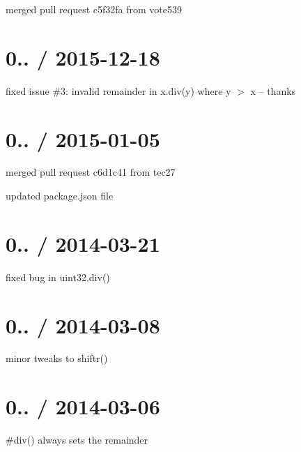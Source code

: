 
\begin{DoxyItemize}
\item merged pull request c5f32fa from vote539
\end{DoxyItemize}

\section*{0.. / 2015-\/12-\/18 }


\begin{DoxyItemize}
\item fixed issue \#3\+: invalid remainder in x.\+div(y) where y $>$ x -- thanks 
\end{DoxyItemize}

\section*{0.. / 2015-\/01-\/05 }


\begin{DoxyItemize}
\item merged pull request c6d1c41 from tec27
\item updated package.\+json file
\end{DoxyItemize}

\section*{0.. / 2014-\/03-\/21 }


\begin{DoxyItemize}
\item fixed bug in uint32.\+div()
\end{DoxyItemize}

\section*{0.. / 2014-\/03-\/08 }


\begin{DoxyItemize}
\item minor tweaks to shiftr()
\end{DoxyItemize}

\section*{0.. / 2014-\/03-\/06 }


\begin{DoxyItemize}
\item \#div() always sets the remainder
\end{DoxyItemize}

